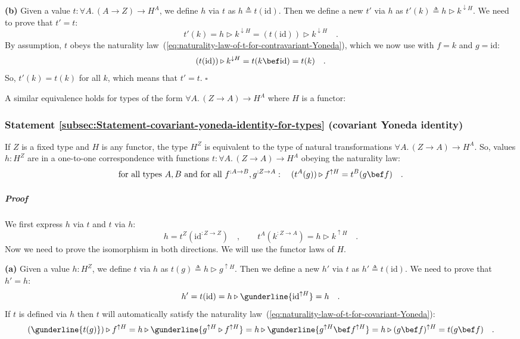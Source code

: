 \textbf{(b)} Given a value $t:\forall A.\,(A\rightarrow Z)\rightarrow H^{A}$,
we define $h$ via $t$ as $h\triangleq t(\text{id})$. Then we define
a new $t'$ via $h$ as $t'(k)\triangleq h\triangleright k^{\downarrow H}$.
We need to prove that $t'=t$:
\[
t'(k)=h\triangleright k^{\downarrow H}=(t(\text{id}))\triangleright k^{\downarrow H}\quad.
\]
By assumption, $t$ obeys the naturality law~(\ref{eq:naturality-law-of-t-for-contravariant-Yoneda}),
which we now use with $f=k$ and $g=\text{id}$:
\[
(t(\text{id}))\triangleright k^{\downarrow H}=t(k\bef\text{id})=t(k)\quad.
\]
So, $t'(k)=t(k)$ for all $k$, which means that $t'=t$. $\square$

A similar equivalence holds for types of the form $\forall A.\,(Z\rightarrow A)\rightarrow H^{A}$
where $H$ is a functor:

\subsubsection{Statement \label{subsec:Statement-covariant-yoneda-identity-for-types}\ref{subsec:Statement-covariant-yoneda-identity-for-types}
(covariant Yoneda identity)}

If $Z$ is a fixed type and $H$ is any functor, the type $H^{Z}$
is equivalent to the type of natural transformations $\forall A.\,(Z\rightarrow A)\rightarrow H^{A}$.
So, values $h:H^{Z}$ are in a one-to-one correspondence with functions
$t:\forall A.\,(Z\rightarrow A)\rightarrow H^{A}$ obeying the naturality
law:
\begin{equation}
\text{for all types }A,B\text{ and for all }f^{:A\rightarrow B},g^{:Z\rightarrow A}:\quad(t^{A}(g))\triangleright f^{\uparrow H}=t^{B}(g\bef f)\quad.\label{eq:naturality-law-of-t-for-covariant-Yoneda}
\end{equation}
 

\subparagraph{Proof}

We first express $h$ via $t$ and $t$ via $h$:
\[
h=t^{Z}(\text{id}^{:Z\rightarrow Z})\quad,\quad\quad t^{A}(k^{:Z\rightarrow A})=h\triangleright k^{\uparrow H}\quad.
\]
 Now we need to prove the isomorphism in both directions. We will
use the functor laws of $H$.

\textbf{(a)} Given a value $h:H^{Z}$, we define $t$ via $h$ as
$t(g)\triangleq h\triangleright g^{\uparrow H}$. Then we define a
new $h'$ via $t$ as $h'\triangleq t(\text{id})$. We need to prove
that $h'=h$:
\[
h'=t(\text{id})=h\triangleright\gunderline{\text{id}^{\uparrow H}}=h\quad.
\]
If $t$ is defined via $h$ then $t$ will automatically satisfy the
naturality law~(\ref{eq:naturality-law-of-t-for-covariant-Yoneda}):
\[
(\gunderline{t(g)})\triangleright f^{\uparrow H}=h\triangleright\gunderline{g^{\uparrow H}\triangleright f^{\uparrow H}}=h\triangleright\gunderline{g^{\uparrow H}\bef f^{\uparrow H}}=h\triangleright(g\bef f)^{\uparrow H}=t(g\bef f)\quad.
\]

